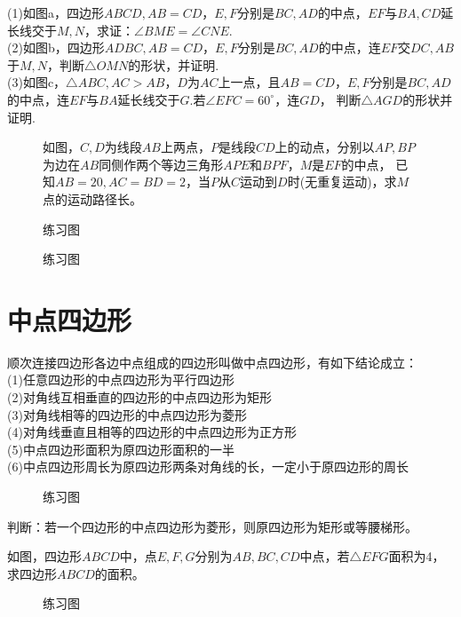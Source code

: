\begin{problem}
(1)如图a，四边形$ABCD,AB=CD$，$E,F$分别是$BC,AD$的中点，$EF$与$BA,CD$延长线交于$M,N$，求证：$\angle BME=\angle CNE$. \\
(2)如图b，四边形$ADBC,AB=CD$，$E,F$分别是$BC,AD$的中点，连$EF$交$DC,AB$于$M,N$，判断$\triangle OMN$的形状，并证明. \\
(3)如图c，$\triangle ABC,AC>AB$，$D$为$AC$上一点，且$AB=CD$，$E,F$分别是$BC,AD$的中点，连$EF$与$BA$延长线交于$G$.若$\angle EFC=60^\circ$，连$GD$，
判断$\triangle AGD$的形状并证明.
\end{problem}
\begin{figure}[H]
    \centering
    \resizebox{12cm}{!}{}
    \caption{练习图}
    \begin{problem}
    如图，$C,D$为线段$AB$上两点，$P$是线段$CD$上的动点，分别以$AP,BP$为边在$AB$同侧作两个等边三角形$APE$和$BPF$，$M$是$EF$的中点，
    已知$AB=20,AC=BD=2$，当$P$从$C$运动到$D$时(无重复运动)，求$M$点的运动路径长。
    \end{problem}
\end{figure}
\begin{figure}[H]
    \centering
    \resizebox{3cm}{!}{}
    \caption{练习图}
\end{figure}
\clearpage
\section{中点四边形}
\begin{theorem}
    顺次连接四边形各边中点组成的四边形叫做中点四边形，有如下结论成立：\\
    (1)任意四边形的中点四边形为平行四边形 \\
    (2)对角线互相垂直的四边形的中点四边形为矩形 \\
    (3)对角线相等的四边形的中点四边形为菱形 \\
    (4)对角线垂直且相等的四边形的中点四边形为正方形 \\
    (5)中点四边形面积为原四边形面积的一半  \\
    (6)中点四边形周长为原四边形两条对角线的长，一定小于原四边形的周长 \\
\end{theorem}
\begin{figure}[H]
    \centering
    \resizebox{10cm}{!}{}
    \caption{练习图}
\end{figure}
\begin{problem}
判断：若一个四边形的中点四边形为菱形，则原四边形为矩形或等腰梯形。
\end{problem}
\begin{problem}
如图，四边形$ABCD$中，点$E,F,G$分别为$AB,BC,CD$中点，若$\triangle EFG$面积为4，求四边形$ABCD$的面积。
\end{problem}
\begin{figure}[H]
    \centering
    \resizebox{4cm}{!}{}
    \caption{练习图}
\end{figure}
\clearpage
